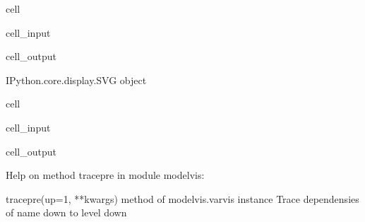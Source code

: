 \documentclass[letterpaper,10pt,english]{jupyterBook}
\begin{document}
\begin{sphinxuseclass}{cell}\begin{sphinxVerbatimInput}

\begin{sphinxuseclass}{cell_input}
\begin{sphinxVerbatim}[commandchars=\\\{\}]
 
     
\end{sphinxVerbatim}

\end{sphinxuseclass}\end{sphinxVerbatimInput}
\begin{sphinxVerbatimOutput}

\begin{sphinxuseclass}{cell_output}
\begin{sphinxVerbatim}[commandchars=\\\{\}]
\PYGZlt{}IPython.core.display.SVG object\PYGZgt{}
\end{sphinxVerbatim}

\end{sphinxuseclass}\end{sphinxVerbatimOutput}

\end{sphinxuseclass}
\begin{sphinxuseclass}{cell}\begin{sphinxVerbatimInput}

\begin{sphinxuseclass}{cell_input}
\begin{sphinxVerbatim}[commandchars=\\\{\}]
\end{sphinxVerbatim}

\end{sphinxuseclass}\end{sphinxVerbatimInput}
\begin{sphinxVerbatimOutput}

\begin{sphinxuseclass}{cell_output}
\begin{sphinxVerbatim}[commandchars=\\\{\}]
Help on method tracepre in module modelvis:

tracepre(up=1, **kwargs) method of modelvis.varvis instance
    Trace dependensies of name down to level down
\end{sphinxVerbatim}

\end{sphinxuseclass}\end{sphinxVerbatimOutput}

\end{sphinxuseclass}
\end{document}
